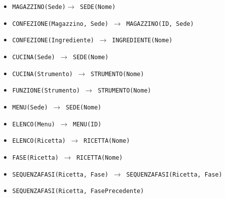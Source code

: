 \begin{itemize}[parsep=0pt,listparindent=9\parindent]
    \item\tt MAGAZZINO(Sede)$\rightarrow$ SEDE(Nome)
    \item\tt CONFEZIONE(Magazzino, Sede) $\rightarrow$ MAGAZZINO(ID, Sede)
    \item\tt CONFEZIONE(Ingrediente) $\rightarrow$ INGREDIENTE(Nome)
    \item\tt CUCINA(Sede) $\rightarrow$ SEDE(Nome)
    \item\tt CUCINA(Strumento) $\rightarrow$ STRUMENTO(Nome)
    \item\tt FUNZIONE(Strumento) $\rightarrow$ STRUMENTO(Nome)
    \item\tt MENU(Sede) $\rightarrow$ SEDE(Nome)
    \item\tt ELENCO(Menu) $\rightarrow$ MENU(ID)
    \item\tt ELENCO(Ricetta) $\rightarrow$ RICETTA(Nome)
    \item\tt FASE(Ricetta) $\rightarrow$ RICETTA(Nome)
    \item\tt SEQUENZAFASI(Ricetta, Fase) $\rightarrow$ SEQUENZAFASI(Ricetta, Fase)
    \item\tt SEQUENZAFASI(Ricetta, FasePrecedente)
    

\end{itemize}
